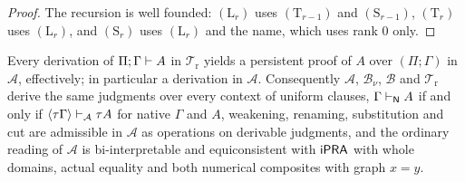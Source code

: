 \begin{proof}
The recursion is well founded: $(\mathrm L_r)$ uses $(\mathrm T_{r-1})$
and $(\mathrm S_{r-1})$, $(\mathrm T_r)$ uses $(\mathrm L_r)$, and
$(\mathrm S_r)$ uses $(\mathrm L_r)$ and the name, which uses rank $0$
only.
\end{proof}

\begin{theorem}
\label{disch:thm:alias-atomic}
Every derivation of $\Pi;\Gamma\vdash A$ in $\mathcal T_{\mathrm r}$ yields
a persistent proof of $A$ over $(\Pi;\Gamma)$ in $\mathcal A$, effectively;
in particular a derivation in $\mathcal A$. Consequently $\mathcal A$,
$\mathcal B_{\nu}$, $\mathcal B$ and $\mathcal T_{\mathrm r}$ derive the
same judgments over every context of uniform clauses,
$\Gamma\vdash_{\mathsf{N}}A$ if and only if
$\langle\tau\Gamma\rangle\vdash_{\mathcal A}\tau A$ for native $\Gamma$
and $A$, weakening, renaming, substitution and cut are admissible in
$\mathcal A$ as operations on derivable judgments, and the ordinary reading
of $\mathcal A$ is bi-interpretable and equiconsistent with $\mathsf{iPRA}$ with
whole domains, actual equality and both numerical composites with graph
$x=y$.
\end{theorem}

